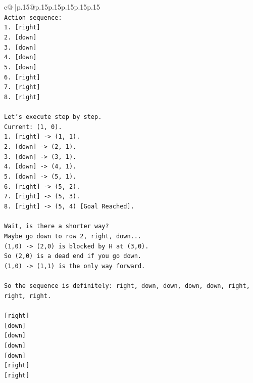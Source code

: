 \documentclass{article}
\begin{document}
{\begin{supertabular}{c@{$\;$}|p{.15\linewidth}@{}p{.15\linewidth}p{.15\linewidth}p{.15\linewidth}p{.15\linewidth}p{.15\linewidth}}
{{{\\ 
\texttt{Action sequence:} \\
\texttt{1. {[}right{]}} \\
\texttt{2. {[}down{]}} \\
\texttt{3. {[}down{]}} \\
\texttt{4. {[}down{]}} \\
\texttt{5. {[}down{]}} \\
\texttt{6. {[}right{]}} \\
\texttt{7. {[}right{]}} \\
\texttt{8. {[}right{]}} \\
\\ 
\texttt{Let's execute step by step.} \\
\texttt{Current: (1, 0).} \\
\texttt{1. {[}right{]} {-}> (1, 1).} \\
\texttt{2. {[}down{]} {-}> (2, 1).} \\
\texttt{3. {[}down{]} {-}> (3, 1).} \\
\texttt{4. {[}down{]} {-}> (4, 1).} \\
\texttt{5. {[}down{]} {-}> (5, 1).} \\
\texttt{6. {[}right{]} {-}> (5, 2).} \\
\texttt{7. {[}right{]} {-}> (5, 3).} \\
\texttt{8. {[}right{]} {-}> (5, 4) {[}Goal Reached{]}.} \\
\\ 
\texttt{Wait, is there a shorter way?} \\
\texttt{Maybe go down to row 2, right, down...} \\
\texttt{(1,0) {-}> (2,0) is blocked by H at (3,0).} \\
\texttt{So (2,0) is a dead end if you go down.} \\
\texttt{(1,0) {-}> (1,1) is the only way forward.} \\
\\ 
\texttt{So the sequence is definitely: right, down, down, down, down, right, right, right.} \\
\\ 
\texttt{{[}right{]}} \\
\texttt{{[}down{]}} \\
\texttt{{[}down{]}} \\
\texttt{{[}down{]}} \\
\texttt{{[}down{]}} \\
\texttt{{[}right{]}} \\
\texttt{{[}right{]}} \\
}}}
\end{supertabular}}
\end{document}
